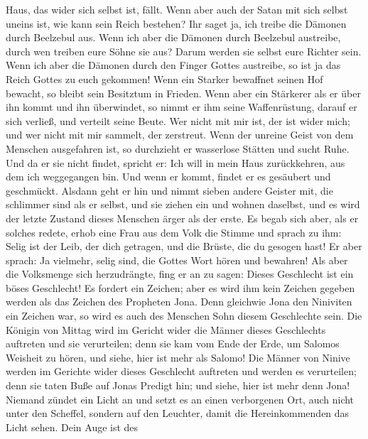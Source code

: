 Haus, das wider sich selbst ist, fällt.  Wenn aber auch
der Satan mit sich selbst uneins ist, wie kann sein Reich bestehen? Ihr
saget ja, ich treibe die Dämonen durch Beelzebul aus. 
Wenn ich aber die Dämonen durch Beelzebul austreibe, durch wen treiben
eure Söhne sie aus? Darum werden sie selbst eure Richter sein.
 Wenn ich aber die Dämonen durch den Finger Gottes
austreibe, so ist ja das Reich Gottes zu euch gekommen! 
Wenn ein Starker bewaffnet seinen Hof bewacht, so bleibt sein Besitztum
in Frieden.  Wenn aber ein Stärkerer als er über ihn
kommt und ihn überwindet, so nimmt er ihm seine Waffenrüstung, darauf er
sich verließ, und verteilt seine Beute.  Wer nicht mit
mir ist, der ist wider mich; und wer nicht mit mir sammelt, der
zerstreut.  Wenn der unreine Geist von dem Menschen
ausgefahren ist, so durchzieht er wasserlose Stätten und sucht Ruhe. Und
da er sie nicht findet, spricht er: Ich will in mein Haus zurückkehren,
aus dem ich weggegangen bin.  Und wenn er kommt, findet
er es gesäubert und geschmückt.  Alsdann geht er hin und
nimmt sieben andere Geister mit, die schlimmer sind als er selbst, und
sie ziehen ein und wohnen daselbst, und es wird der letzte Zustand
dieses Menschen ärger als der erste.  Es begab sich aber,
als er solches redete, erhob eine Frau aus dem Volk die Stimme und
sprach zu ihm: Selig ist der Leib, der dich getragen, und die Brüste,
die du gesogen hast!  Er aber sprach: Ja vielmehr, selig
sind, die Gottes Wort hören und bewahren!  Als aber die
Volksmenge sich herzudrängte, fing er an zu sagen: Dieses Geschlecht ist
ein böses Geschlecht! Es fordert ein Zeichen; aber es wird ihm kein
Zeichen gegeben werden als das Zeichen des Propheten Jona.
 Denn gleichwie Jona den Niniviten ein Zeichen war, so
wird es auch des Menschen Sohn diesem Geschlechte sein. 
Die Königin von Mittag wird im Gericht wider die Männer dieses
Geschlechts auftreten und sie verurteilen; denn sie kam vom Ende der
Erde, um Salomos Weisheit zu hören, und siehe, hier ist mehr als Salomo!
 Die Männer von Ninive werden im Gerichte wider dieses
Geschlecht auftreten und werden es verurteilen; denn sie taten Buße auf
Jonas Predigt hin; und siehe, hier ist mehr denn Jona! 
Niemand zündet ein Licht an und setzt es an einen verborgenen Ort, auch
nicht unter den Scheffel, sondern auf den Leuchter, damit die
Hereinkommenden das Licht sehen.  Dein Auge ist des
